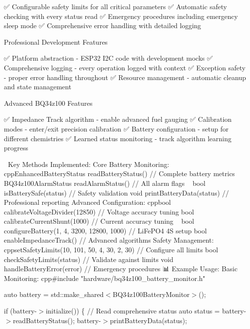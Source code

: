 ✅ Configurable safety limits for all critical parameters ✅ Automatic safety checking with every status read ✅ Emergency procedures including emergency sleep mode ✅ Comprehensive error handling with detailed logging


\begin{DoxyEnumerate}
\item Professional Development Features
\end{DoxyEnumerate}

✅ Platform abstraction -\/ ESP32 I2C code with development mocks ✅ Comprehensive logging -\/ every operation logged with context ✅ Exception safety -\/ proper error handling throughout ✅ Resource management -\/ automatic cleanup and state management


\begin{DoxyEnumerate}
\item Advanced BQ34z100 Features
\end{DoxyEnumerate}

✅ Impedance Track algorithm -\/ enable advanced fuel gauging ✅ Calibration modes -\/ enter/exit precision calibration ✅ Battery configuration -\/ setup for different chemistries ✅ Learned status monitoring -\/ track algorithm learning progress

🎯 Key Methods Implemented\+: Core Battery Monitoring\+: cpp\+Enhanced\+Battery\+Status read\+Battery\+Status() // Complete battery metrics BQ34z100\+Alarm\+Status read\+Alarm\+Status() // All alarm flags ~\newline
 bool is\+Battery\+Safe(status) // Safety validation void print\+Battery\+Data(status) // Professional reporting Advanced Configuration\+: cppbool calibrate\+Voltage\+Divider(12850) // Voltage accuracy tuning bool calibrate\+Current\+Shunt(1000) // Current accuracy tuning ~\newline
 bool configure\+Battery(1, 4, 3200, 12800, 1000) // Li\+Fe\+PO4 4S setup bool enable\+Impedance\+Track() // Advanced algorithms Safety Management\+: cppset\+Safety\+Limits(10, 101, 50, 4, 30, 2, 30) // Configure all limits bool check\+Safety\+Limits(status) // Validate against limits void handle\+Battery\+Error(error) // Emergency procedures 📊 Example Usage\+: Basic Monitoring\+: cpp\#include "{}hardware/bq34z100\+\_\+battery\+\_\+monitor.\+h"{}

auto battery = std\+::make\+\_\+shared$<$\+BQ34z100\+Battery\+Monitor$>$();

if (battery-\/\texorpdfstring{$>$}{>}initialize()) \{ // Read comprehensive status auto status = battery-\/\texorpdfstring{$>$}{>}read\+Battery\+Status(); battery-\/\texorpdfstring{$>$}{>}print\+Battery\+Data(status);

